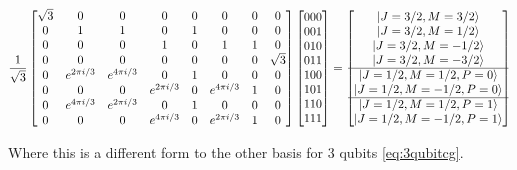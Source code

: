 \begin{align}
\frac{1}{\sqrt{3}}
\begin{bmatrix}
\sqrt{3} &0 &0 &0 &0 &0 &0 &0 \\
0 &1 &1 &0 &1 &0 &0 &0 \\
0 &0 &0 &1 &0 &1 &1 &0\\
0 &0 &0 &0 &0 &0 &0 &\sqrt{3} \\
0 &e^{2\pi i/3} &e^{4\pi i/3} &0 &1 &0 &0 &0 \\
0 &0 &0 &e^{2\pi i/3} &0 &e^{4\pi i/3} &1 &0 \\
0 &e^{4\pi i/3} &e^{2\pi i/3} &0 &1 &0 &0 &0\\
0 &0 &0 &e^{4\pi i/3} &0 &e^{2\pi i/3} &1 &0 \\
\end{bmatrix}
\begin{bmatrix}
000 \\
001 \\
010 \\
011 \\
100 \\
101 \\
110 \\
111 \\
\end{bmatrix}
=
\begin{bmatrix}
\left\vert{J=3/2, M=3/2}\right\rangle \\
\left\vert{J=3/2, M=1/2}\right\rangle \\
\left\vert{J=3/2, M=-1/2}\right\rangle \\
\left\vert{J=3/2, M=-3/2}\right\rangle \\ 
\hline
\left\vert{J=1/2, M=1/2, P=0}\right\rangle \\
\left\vert{J=1/2, M=-1/2, P=0}\right\rangle \\
\hline
\left\vert{J=1/2, M=1/2, P=1}\right\rangle \\
\left\vert{J=1/2, M=-1/2, P=1}\right\rangle \\ 
\end{bmatrix}
\label{eq:phaseencode}
\end{align}

Where this is a different form to the other basis for 3 qubits \autoref{eq:3qubitcg}.

